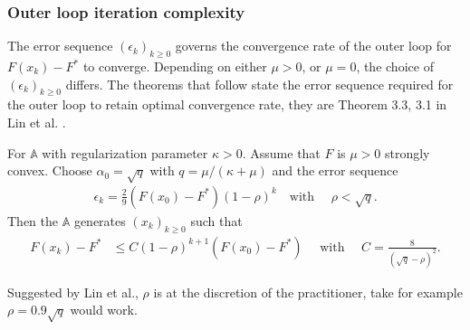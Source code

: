 \documentclass[12pt]{article}
\begin{document}
        \subsubsection{Outer loop iteration complexity}
            The error sequence $(\epsilon_k)_{k \ge 0}$ governs the convergence rate of the outer loop for $F(x_k) - F^*$ to converge. 
            Depending on either $\mu > 0$, or $\mu = 0$, the choice of $(\epsilon_k)_{k\ge 0}$ differs. 
            The theorems that follow state the error sequence required for the outer loop to retain optimal convergence rate, they are Theorem 3.3, 3.1 in Lin et al. \cite{lin_universal_2015}. 
            \begin{theorem}\label{thm:err-seq-outer-s-cnvx}
                For $\mathbb A$ with regularization parameter $\kappa > 0$. 
                Assume that $F$ is $\mu > 0$ strongly convex. 
                Choose $\alpha_0 = \sqrt{q}$ with $q = \mu/(\kappa + \mu)$ and the error sequence 
                $$
                \begin{aligned}
                    \epsilon_k = \frac{2}{9}(F(x_0) - F^*)(1 - \rho)^k \quad \text{with }\quad 
                    \rho < \sqrt{q}. 
                \end{aligned}
                $$
                Then the $\mathbb A$ generates $(x_{k})_{k \ge 0}$ such that 
                $$
                \begin{aligned}
                    F(x_k) - F^* &\le 
                    C(1 - \rho)^{k + 1} (F(x_0) - F^*) \quad \text{ with }\quad 
                    C = \frac{8}{(\sqrt{q} - \rho)^2}. 
                \end{aligned}
                $$
            \end{theorem}
            \begin{remark}
                Suggested by Lin et al., $\rho$ is at the discretion of the practitioner, take for example $\rho = 0.9\sqrt{q}$ would work. 
            \end{remark}
\end{document}
